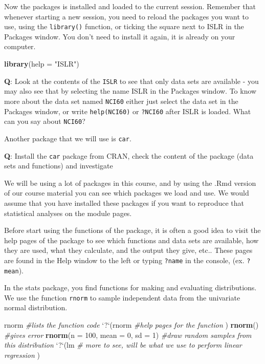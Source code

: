 \documentclass[]{article}
\newenvironment{Shaded}{\begin{snugshade}}{\end{snugshade}}
\newcommand{\KeywordTok}[1]{\textcolor[rgb]{0.13,0.29,0.53}{\textbf{#1}}}
\newcommand{\DataTypeTok}[1]{\textcolor[rgb]{0.13,0.29,0.53}{#1}}
\newcommand{\DecValTok}[1]{\textcolor[rgb]{0.00,0.00,0.81}{#1}}
\newcommand{\StringTok}[1]{\textcolor[rgb]{0.31,0.60,0.02}{#1}}
\newcommand{\CommentTok}[1]{\textcolor[rgb]{0.56,0.35,0.01}{\textit{#1}}}
\newcommand{\NormalTok}[1]{#1}
\begin{document}
Now the packages is installed and loaded to the current session.
Remember that whenever starting a new session, you need to reload the
packages you want to use, using the \texttt{library()} function, or
ticking the square next to ISLR in the Packages window. You don't need
to install it again, it is already on your computer.

\begin{Shaded}
\begin{Highlighting}[]
\KeywordTok{library}\NormalTok{(}\DataTypeTok{help =} \StringTok{"ISLR"}\NormalTok{)}
\end{Highlighting}
\end{Shaded}

\textbf{Q}: Look at the contents of the \texttt{ISLR} to see that only
data sets are available - you may also see that by selecting the name
ISLR in the Packages window. To know more about the data set named
\texttt{NCI60} either just select the data set in the Packages window,
or write \texttt{help(NCI60)} or \texttt{?NCI60} after ISLR is loaded.
What can you say about \texttt{NCI60}?

Another package that we will use is \texttt{car}.

\textbf{Q}: Install the \texttt{car} package from CRAN, check the
content of the package (data sets and functions) and investigate

We will be using a lot of packages in this course, and by using the .Rmd
version of our course material you can see which packages we load and
use. We would assume that you have installed these packages if you want
to reproduce that statistical analyses on the module pages.

Before start using the functions of the package, it is often a good idea
to visit the help pages of the package to see which functions and data
sets are available, how they are used, what they calculate, and the
output they give, etc.. These pages are found in the Help window to the
left or typing \texttt{?name} in the console, (ex. \texttt{?mean}).

In the stats package, you find functions for making and evaluating
distributions. We use the function \texttt{rnorm} to sample independent
data from the univariate normal distribution.

\begin{Shaded}
\begin{Highlighting}[]
\NormalTok{rnorm  }\CommentTok{#lists the function code}
\StringTok{`}\DataTypeTok{?}\StringTok{`}\NormalTok{(rnorm  }\CommentTok{#help pages for the function}
\NormalTok{)}
\KeywordTok{rnorm}\NormalTok{()  }\CommentTok{#gives error}
\KeywordTok{rnorm}\NormalTok{(}\DataTypeTok{n =} \DecValTok{100}\NormalTok{, }\DataTypeTok{mean =} \DecValTok{0}\NormalTok{, }\DataTypeTok{sd =} \DecValTok{1}\NormalTok{)  }\CommentTok{#draw random samples from this distribution}
\StringTok{`}\DataTypeTok{?}\StringTok{`}\NormalTok{(lm  }\CommentTok{# more to see, will be what we use to perform linear regression}
\NormalTok{)}
\end{Highlighting}
\end{Shaded}
\end{document}
